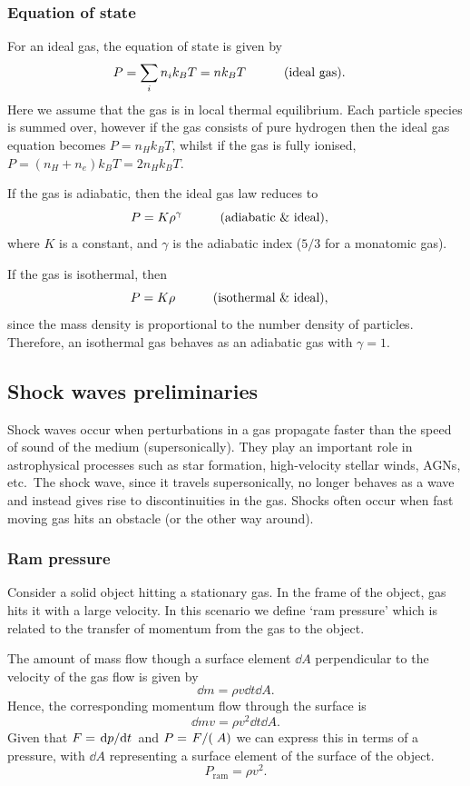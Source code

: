\subsubsection{Equation of state}
For an ideal gas, the equation of state is given by
%
\begin{equation}
	P = \sum_{i}n_i k_B T = n k_B T \qquad \qq{(ideal gas).}
	\label{eq:AP:ideal_gas}
\end{equation}
%
Here we assume that the gas is in local thermal equilibrium.
 Each particle species is summed over, however if the gas consists of pure hydrogen then the ideal gas equation becomes \(P = n_H k_B T\), whilst if the gas is fully ionised, \(P = (n_H + n_e)k_B T = 2n_H k_B T\).
\par 
If the gas is adiabatic, then the ideal gas law reduces to
%
\begin{equation}
	P = K \rho^\gamma \qquad \qq{(adiabatic \& ideal),}
	\label{eq:AP:adiabatic_ideal_gas}
\end{equation}
%
where \(K\) is a constant, and \(\gamma\) is the adiabatic index (\(5/3\) for a monatomic gas).
\par 
If the gas is isothermal, then
%
\begin{equation}
	P = K\rho \qquad \qq{(isothermal \& ideal),}
	\label{eq:AP:isothermal_ideal_gas}
\end{equation}
%
since the mass density is proportional to the number density of particles.
 Therefore, an isothermal gas behaves as an adiabatic gas with \(\gamma = 1\).
%
%
\subsection{Shock waves preliminaries}
Shock waves occur when perturbations in a gas propagate faster than the speed of sound of the medium (supersonically).
 They play an important role in astrophysical processes such as star formation, high-velocity stellar winds, AGNs, etc.\
 The shock wave, since it travels supersonically, no longer behaves as a wave and instead gives rise to discontinuities in the gas.
 Shocks often occur when fast moving gas hits an obstacle (or the other way around).
%
\subsubsection{Ram pressure}
Consider a solid object hitting a stationary gas.
 In the frame of the object, gas hits it with a large velocity.
 In this scenario we define `ram pressure' which is related to the transfer of momentum from the gas to the object.
\par 
The amount of mass flow though a surface element \(\dd{A}\) perpendicular to the velocity of the gas flow is given by
%
\[\dd{m} = \rho v \dd{t} \dd{A}.\]
%
Hence, the corresponding momentum flow through the surface is
%
\[\dd{m} v = \rho v^2 \dd{t} \dd{A}.\]
%
Given that \(F = \dv*{p}{t}\) and \(P = \flatfrac{F}(A)\) we can express this in terms of a pressure, with \(\dd{A}\) representing a surface element of the surface of the object.
%
\begin{equation}
	P_\text{ram} = \rho v^2.
	\label{eq:AP:ram_pressure}
\end{equation}
%
